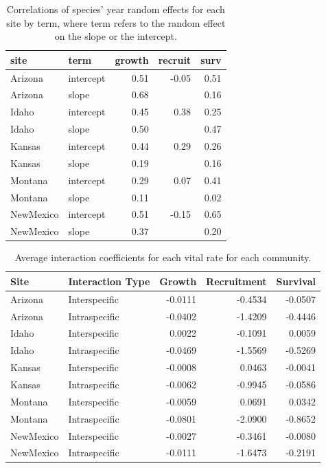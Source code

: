 \documentclass[12pt,]{article}
\begin{document}
\newpage{}

\begin{table}[ht]
\centering
\caption{Correlations of species' year random effects for each site by term, where term refers to the random effect on the slope or the intercept.} 
\begin{tabular}{llrrr}
  \hline
site & term & growth & recruit & surv \\ 
  \hline
Arizona & intercept & 0.51 & -0.05 & 0.51 \\ 
  Arizona & slope & 0.68 &  & 0.16 \\ 
  Idaho & intercept & 0.45 & 0.38 & 0.25 \\ 
  Idaho & slope & 0.50 &  & 0.47 \\ 
  Kansas & intercept & 0.44 & 0.29 & 0.26 \\ 
  Kansas & slope & 0.19 &  & 0.16 \\ 
  Montana & intercept & 0.29 & 0.07 & 0.41 \\ 
  Montana & slope & 0.11 &  & 0.02 \\ 
  NewMexico & intercept & 0.51 & -0.15 & 0.65 \\ 
  NewMexico & slope & 0.37 &  & 0.20 \\ 
   \hline
\end{tabular}
\end{table}

\newpage{}

\begin{table}[ht]
\centering
\caption{Average interaction coefficients for each vital rate for each community.} 
\begin{tabular}{llrrr}
  \hline
Site & Interaction Type & Growth & Recruitment & Survival \\ 
  \hline
Arizona & Interspecific & -0.0111 & -0.4534 & -0.0507 \\ 
  Arizona & Intraspecific & -0.0402 & -1.4209 & -0.4446 \\ 
  Idaho & Interspecific & 0.0022 & -0.1091 & 0.0059 \\ 
  Idaho & Intraspecific & -0.0469 & -1.5569 & -0.5269 \\ 
  Kansas & Interspecific & -0.0008 & 0.0463 & -0.0041 \\ 
  Kansas & Intraspecific & -0.0062 & -0.9945 & -0.0586 \\ 
  Montana & Interspecific & -0.0059 & 0.0691 & 0.0342 \\ 
  Montana & Intraspecific & -0.0801 & -2.0900 & -0.8652 \\ 
  NewMexico & Interspecific & -0.0027 & -0.3461 & -0.0080 \\ 
  NewMexico & Intraspecific & -0.0111 & -1.6473 & -0.2191 \\ 
   \hline
\end{tabular}
\end{table}
\end{document}
